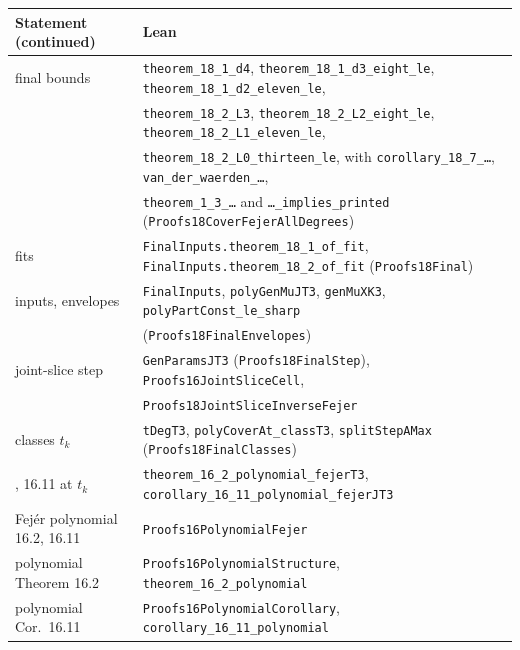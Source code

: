 \documentclass[11pt]{article}
\theoremstyle{definition}
\theoremstyle{remark}
\newcommand{\lean}[1]{\texttt{#1}}
\begin{document}
\begin{center}\footnotesize
\begin{tabular}{>{\raggedright\arraybackslash}p{}>{\raggedright\arraybackslash}p{}}
\toprule
Statement (continued) & Lean\\
\midrule
final bounds & \lean{theorem\_18\_1\_d4}, \lean{theorem\_18\_1\_d3\_eight\_le}, \lean{theorem\_18\_1\_d2\_eleven\_le},\\
& \lean{theorem\_18\_2\_L3}, \lean{theorem\_18\_2\_L2\_eight\_le}, \lean{theorem\_18\_2\_L1\_eleven\_le},\\
& \lean{theorem\_18\_2\_L0\_thirteen\_le}, with \lean{corollary\_18\_7\_\ldots}, \lean{van\_der\_waerden\_\ldots},\\
& \lean{theorem\_1\_3\_\ldots} and \lean{\ldots\_implies\_printed} (\lean{Proofs18CoverFejerAllDegrees})\\
fits & \lean{FinalInputs.theorem\_18\_1\_of\_fit}, \lean{FinalInputs.theorem\_18\_2\_of\_fit} (\lean{Proofs18Final})\\
inputs, envelopes & \lean{FinalInputs}, \lean{polyGenMuJT3}, \lean{genMuXK3}, \lean{polyPartConst\_le\_sharp}\\
& (\lean{Proofs18FinalEnvelopes})\\
joint-slice step & \lean{GenParamsJT3} (\lean{Proofs18FinalStep}), \lean{Proofs16JointSliceCell},\\
& \lean{Proofs18JointSliceInverseFejer}\\
classes $t_k$ & \lean{tDegT3}, \lean{polyCoverAt\_classT3}, \lean{splitStepAMax} (\lean{Proofs18FinalClasses})\\
16.2, 16.11 at $t_k$ & \lean{theorem\_16\_2\_polynomial\_fejerT3}, \lean{corollary\_16\_11\_polynomial\_fejerJT3}\\
Fej\'er polynomial 16.2, 16.11 & \lean{Proofs16PolynomialFejer}\\
polynomial Theorem 16.2 & \lean{Proofs16PolynomialStructure}, \lean{theorem\_16\_2\_polynomial}\\
polynomial Cor.~16.11 & \lean{Proofs16PolynomialCorollary}, \lean{corollary\_16\_11\_polynomial}\\
\bottomrule
\end{tabular}
\end{center}
\end{document}
